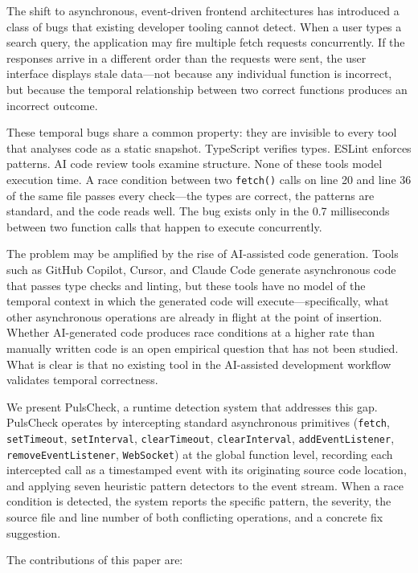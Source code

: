 \documentclass[11pt,a4paper]{article}
\begin{document}
The shift to asynchronous, event-driven frontend architectures has introduced a class of bugs that existing developer tooling cannot detect. When a user types a search query, the application may fire multiple fetch requests concurrently. If the responses arrive in a different order than the requests were sent, the user interface displays stale data---not because any individual function is incorrect, but because the temporal relationship between two correct functions produces an incorrect outcome.

These temporal bugs share a common property: they are invisible to every tool that analyses code as a static snapshot. TypeScript verifies types. ESLint enforces patterns. AI code review tools examine structure. None of these tools model execution time. A race condition between two \texttt{fetch()} calls on line 20 and line 36 of the same file passes every check---the types are correct, the patterns are standard, and the code reads well. The bug exists only in the 0.7 milliseconds between two function calls that happen to execute concurrently.

The problem may be amplified by the rise of AI-assisted code generation. Tools such as GitHub Copilot, Cursor, and Claude Code generate asynchronous code that passes type checks and linting, but these tools have no model of the temporal context in which the generated code will execute---specifically, what other asynchronous operations are already in flight at the point of insertion. Whether AI-generated code produces race conditions at a higher rate than manually written code is an open empirical question that has not been studied. What is clear is that no existing tool in the AI-assisted development workflow validates temporal correctness.

We present PulsCheck, a runtime detection system that addresses this gap. PulsCheck operates by intercepting standard asynchronous primitives (\texttt{fetch}, \texttt{setTimeout}, \texttt{setInterval}, \texttt{clearTimeout}, \texttt{clearInterval}, \texttt{addEventListener}, \texttt{removeEventListener}, \texttt{WebSocket}) at the global function level, recording each intercepted call as a timestamped event with its originating source code location, and applying seven heuristic pattern detectors to the event stream. When a race condition is detected, the system reports the specific pattern, the severity, the source file and line number of both conflicting operations, and a concrete fix suggestion.

The contributions of this paper are:
\end{document}
